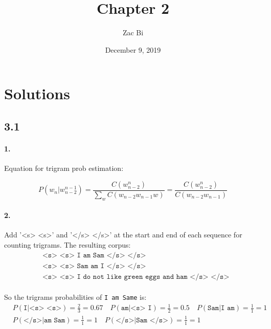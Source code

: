 \documentclass{article}
\begin{document}
\begin{titlepage}
    \title{Chapter 2}
    \author{Zac Bi}
    \date{December 9, 2019}
    \maketitle
    \pagestyle{empty}
\end{titlepage}


\section*{Solutions}

\subsection*{3.1}

\paragraph{1.}
Equation for trigram prob estimation:

$$P(w_n|w_{n-2}^{n-1}) =  \displaystyle\frac{C(w_{n-2}^{n})}{\sum_{w} C(w_{n-2} w_{n-1} w)} = \displaystyle\frac{C(w_{n-2}^{n})}{C(w_{n-2} w_{n-1})}$$

\paragraph{2.}
Add '<s> <s>' and '</s> </s>' at the start and end  of each sequence for counting trigrams.
The resulting corpus:
\begin{align*}
     & \texttt{<s> <s> I am Sam </s> </s>}                         \\
     & \texttt{<s> <s> Sam am I </s> </s>}                         \\
     & \texttt{<s> <s> I do not like green eggs and ham </s> </s>}
\end{align*}

\paragraph{}
So the trigrams probabilities of \texttt{I am Same} is:
\begin{align*}
     & P(\texttt{I|<s> <s>}) = \frac{2}{3} = 0.67 \quad
    P(\texttt{am|<s> I}) = \frac{1}{2} = 0.5 \quad
    P(\texttt{Sam|I am}) = \frac{1}{1} = 1              \\
     & P(\texttt{</s>|am Sam}) = \frac{1}{1} = 1 \quad
    P(\texttt{</s>|Sam </s>}) = \frac{1}{1} = 1 \quad
\end{align*}
\end{document}

